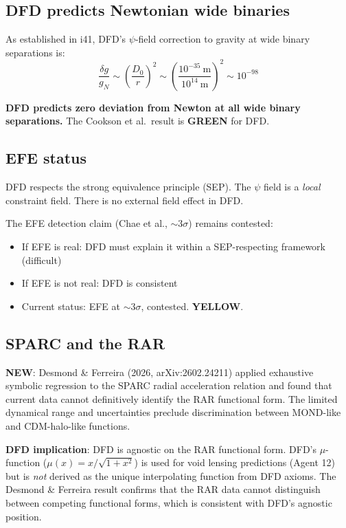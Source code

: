 \documentclass[11pt,a4paper]{article}
\newcommand{\GREEN}{\textcolor{dfdgreen}{\textbf{GREEN}}}
\newcommand{\YELLOW}{\textcolor{dfdyellow}{\textbf{YELLOW}}}
\newcommand{\NEW}{\textcolor{dfdblue}{\textbf{NEW}}}
\begin{document}
\subsection{DFD predicts Newtonian wide binaries}

As established in i41, DFD's $\psi$-field correction to gravity at wide binary separations is:
\begin{equation}
\frac{\delta g}{g_N} \sim \left(\frac{D_0}{r}\right)^2 \sim \left(\frac{10^{-35}~\text{m}}{10^{14}~\text{m}}\right)^2 \sim 10^{-98}
\end{equation}

\textbf{DFD predicts zero deviation from Newton at all wide binary separations.} The Cookson et al.\ result is \GREEN{} for DFD.

\subsection{EFE status}

DFD respects the strong equivalence principle (SEP). The $\psi$ field is a \emph{local} constraint field. There is no external field effect in DFD.

The EFE detection claim (Chae et al., $\sim 3\sigma$) remains contested:
\begin{itemize}
\item If EFE is real: DFD must explain it within a SEP-respecting framework (difficult)
\item If EFE is not real: DFD is consistent
\item Current status: EFE at $\sim 3\sigma$, contested. \YELLOW{}.
\end{itemize}

\subsection{SPARC and the RAR}

\textbf{\NEW}: Desmond \& Ferreira (2026, arXiv:2602.24211) applied exhaustive symbolic regression to the SPARC radial acceleration relation and found that current data cannot definitively identify the RAR functional form. The limited dynamical range and uncertainties preclude discrimination between MOND-like and CDM-halo-like functions.

\textbf{DFD implication}: DFD is agnostic on the RAR functional form. DFD's $\mu$-function ($\mu(x) = x/\sqrt{1+x^2}$) is used for void lensing predictions (Agent 12) but is \emph{not} derived as the unique interpolating function from DFD axioms. The Desmond \& Ferreira result confirms that the RAR data cannot distinguish between competing functional forms, which is consistent with DFD's agnostic position.
\end{document}
